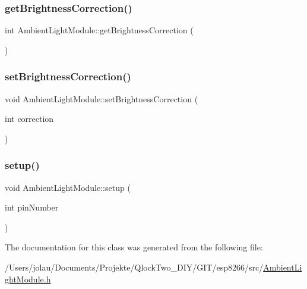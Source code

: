 \subsubsection{\texorpdfstring{getBrightnessCorrection()}{getBrightnessCorrection()}}
{\footnotesize\ttfamily int Ambient\+Light\+Module\+::get\+Brightness\+Correction (\begin{DoxyParamCaption}{ }\end{DoxyParamCaption})}

\mbox{\label{class_ambient_light_module_a1a8cce98e966888ab2f1b177835b3efe}} 
\subsubsection{\texorpdfstring{setBrightnessCorrection()}{setBrightnessCorrection()}}
{\footnotesize\ttfamily void Ambient\+Light\+Module\+::set\+Brightness\+Correction (\begin{DoxyParamCaption}\item[{int}]{correction }\end{DoxyParamCaption})}

\mbox{\label{class_ambient_light_module_a81e6f755ce07dfabe34bcb7ef61fcf41}} 
\subsubsection{\texorpdfstring{setup()}{setup()}}
{\footnotesize\ttfamily void Ambient\+Light\+Module\+::setup (\begin{DoxyParamCaption}\item[{int}]{pin\+Number }\end{DoxyParamCaption})}



The documentation for this class was generated from the following file\+:\begin{DoxyCompactItemize}
\item 
/\+Users/jolau/\+Documents/\+Projekte/\+Qlock\+Two\+\_\+\+D\+I\+Y/\+G\+I\+T/esp8266/src/\mbox{\hyperlink{_ambient_light_module_8h}{Ambient\+Light\+Module.\+h}}\end{DoxyCompactItemize}
